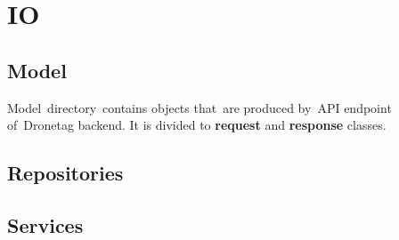 \section{IO}\label{sec:io}

\subsection{Model}\label{subsec:model}
Model~directory~contains objects that~are produced by~API endpoint of~Dronetag backend.
It is divided to \textbf{request} and \textbf{response} classes.

\subsection{Repositories}\label{subsec:respositories}

\subsection{Services}\label{subsec:services}
